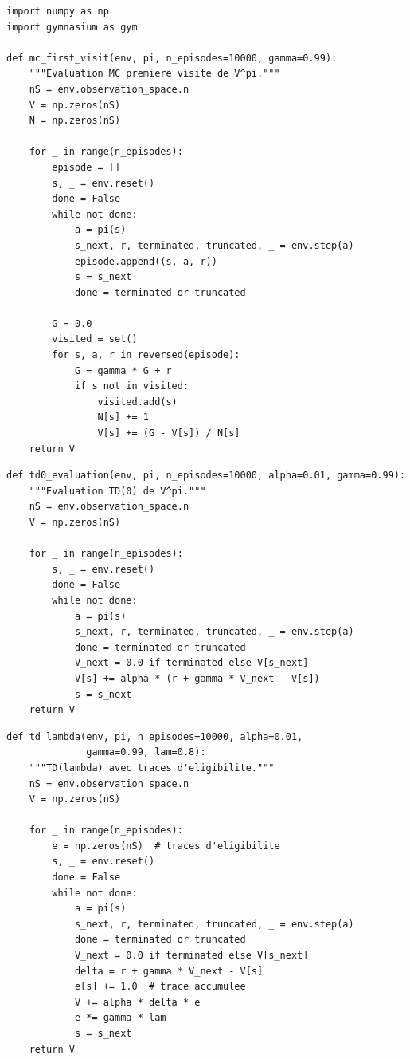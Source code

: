 \begin{codeblock}[title=\textbf{\'Evaluation Monte Carlo premi\`ere visite}]
\begin{verbatim}
import numpy as np
import gymnasium as gym

def mc_first_visit(env, pi, n_episodes=10000, gamma=0.99):
    """Evaluation MC premiere visite de V^pi."""
    nS = env.observation_space.n
    V = np.zeros(nS)
    N = np.zeros(nS)

    for _ in range(n_episodes):
        episode = []
        s, _ = env.reset()
        done = False
        while not done:
            a = pi(s)
            s_next, r, terminated, truncated, _ = env.step(a)
            episode.append((s, a, r))
            s = s_next
            done = terminated or truncated

        G = 0.0
        visited = set()
        for s, a, r in reversed(episode):
            G = gamma * G + r
            if s not in visited:
                visited.add(s)
                N[s] += 1
                V[s] += (G - V[s]) / N[s]
    return V
\end{verbatim}
\end{codeblock}

\begin{codeblock}[title=\textbf{TD(0) pour l'\'evaluation de politique}]
\begin{verbatim}
def td0_evaluation(env, pi, n_episodes=10000, alpha=0.01, gamma=0.99):
    """Evaluation TD(0) de V^pi."""
    nS = env.observation_space.n
    V = np.zeros(nS)

    for _ in range(n_episodes):
        s, _ = env.reset()
        done = False
        while not done:
            a = pi(s)
            s_next, r, terminated, truncated, _ = env.step(a)
            done = terminated or truncated
            V_next = 0.0 if terminated else V[s_next]
            V[s] += alpha * (r + gamma * V_next - V[s])
            s = s_next
    return V
\end{verbatim}
\end{codeblock}

\begin{codeblock}[title=\textbf{TD($\lambda$) avec traces d'\'eligibilit\'e}]
\begin{verbatim}
def td_lambda(env, pi, n_episodes=10000, alpha=0.01,
              gamma=0.99, lam=0.8):
    """TD(lambda) avec traces d'eligibilite."""
    nS = env.observation_space.n
    V = np.zeros(nS)

    for _ in range(n_episodes):
        e = np.zeros(nS)  # traces d'eligibilite
        s, _ = env.reset()
        done = False
        while not done:
            a = pi(s)
            s_next, r, terminated, truncated, _ = env.step(a)
            done = terminated or truncated
            V_next = 0.0 if terminated else V[s_next]
            delta = r + gamma * V_next - V[s]
            e[s] += 1.0  # trace accumulee
            V += alpha * delta * e
            e *= gamma * lam
            s = s_next
    return V
\end{verbatim}
\end{codeblock}

